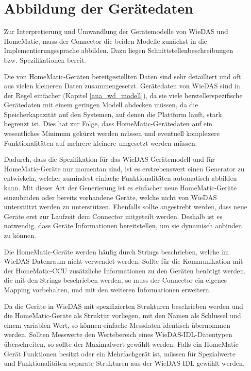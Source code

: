 \section{Abbildung der Gerätedaten}
\label{ana_abb}

Zur Interpretierung und Umwandlung der Gerätemodelle von WieDAS und HomeMatic, muss der Connector
die beiden Modelle zunächst in die Implementierungssprache abbilden.
Dazu liegen Schnittstellenbeschreibungen bzw. Spezifikationen bereit.

Die von HomeMatic-Geräten bereitgestellten Daten sind sehr detailliert und oft aus vielen kleineren
Daten zusammengesetzt.
Gerätedaten von WieDAS sind in der Regel einfacher (Kapitel \ref{ana_wd_modell}), da sie viele
herstellerspezifische Gerätedaten mit einem geringen Modell abdecken müssen, da die Speicherkapazität
auf den Systemen, auf denen die Plattform läuft, stark begrenzt ist.
Dies hat zur Folge, dass HomeMatic-Gerätedaten auf ein wesentliches Minimum gekürzt werden müssen und
eventuell komplexere Funktionalitäten auf mehrere kleinere umgesetzt werden müssen.

Dadurch, dass die Spezifikation für das WieDAS-Gerätemodell und für HomeMatic-Geräte nur momentan sind,
ist es erstrebenswert einen Generator zu entwickeln, welcher zumindest einfache Funktionalitäten
automatisch abbilden kann.
Mit dieser Art der Generierung ist es einfacher neue HomeMatic-Geräte einzubinden oder bereits vorhandene
Geräte, welche nicht von WieDAS unterstützt werden zu unterstützen.
Ebenfalls sollte angestrebt werden, dass neue Geräte erst zur Laufzeit dem Connector mitgeteilt werden.
Deshalb ist es notwendig, dass Geräte Informationen bereitstellen, um sie dynamisch anbinden zu können.

Die HomeMatic-Geräte werden häufig durch Strings beschrieben, welche im WieDAS-Datenraum nicht
verwendet werden.
Sollte für die Kommunikation mit der HomeMatic-CCU zusätzliche Informationen zu den Geräten benötigt
werden, die mit den Strings beschrieben werden, so muss der Connector ein eigenes Mapping vorbehalten,
und mit den weiteren Informationen erweitern.

Da die Geräte in WieDAS mit spezifizierten Strukturen beschrieben werden und die HomeMatic-Geräte
als Struktur vorliegen, mit den Namen als Schlüssel und einem variablen Wert, so können einfache
Messdaten identisch übernommen werden.
Sollten Messwerte den Wertebereich eines WieDAS-IDL-Datentypen überschreiten, so sollte der Maximalwert
gewählt werden.
Falls ein HomeMatic-Gerät Funktionen besitzt oder ein Mehrfachgerät ist, müssen für Spezialwerte und
Funktionalitäten separate Strukturen aus der WieDAS-IDL gewählt werden.

